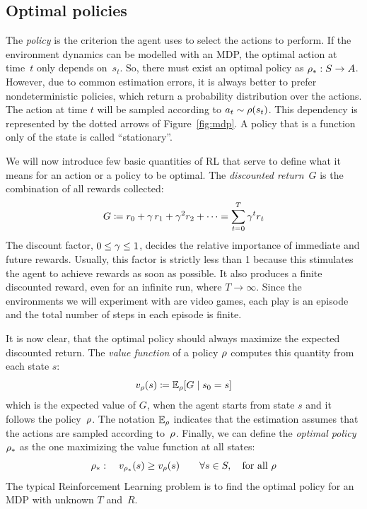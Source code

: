 \subsection{Optimal policies}

The \emph{policy} is the criterion the agent uses to select the actions to
perform. If the environment dynamics can be modelled with an MDP, the
optimal action at time~$t$ only depends on~$s_{t}$. So, there must exist
an optimal policy as ${\rho}_*: S \to A$. However, due to common
estimation errors, it is always better to prefer nondeterministic policies,
which return a probability distribution over the actions. The action at time
$t$ will be sampled according to $a_t \sim \rho(s_t)$. This dependency is
represented by the dotted arrows of Figure~\ref{fig:mdp}. A policy that is a
function only of the state is called ``stationary''.

We will now introduce few basic quantities of RL that serve to define what it
means for an action or a policy to be optimal. The \emph{discounted
return}~$G$ is the combination of all rewards collected:
\begin{equation}
	G \coloneqq r_{0} + \gamma\, r_1 + \gamma^2 r_2 + \dots =
	\sum_{t=0}^{T} \gamma^{t} r_{t}
	\label{eq:return}
\end{equation}
The discount factor, $0 \le \gamma \le 1$, decides the relative importance
of immediate and future rewards. Usually, this factor is strictly less than 1
because this stimulates the agent to achieve rewards as soon as possible.
It also produces a finite discounted reward, even for an infinite run, where
$T \to \infty$.  Since the environments we will experiment with are video
games, each play is an episode and the total number of steps in each episode
is finite.

It is now clear, that the optimal policy should always maximize the expected
discounted return. The \emph{value function} of a policy $\rho$ computes
this quantity from each state $s$:
\begin{equation}
	v_{\rho}(s) \coloneqq \mathbb{E}_{\rho}[G \mid s_0 = s]
\end{equation}
which is the expected value of $G$, when the agent starts from state $s$
and it follows the policy~$\rho$. The notation $\mathbb{E}_{\rho}$ indicates
that the estimation assumes that the actions are sampled according
to~$\rho$. Finally, we can define the \emph{optimal policy}
${\rho}_*$ as the one maximizing the value function at all states:
\begin{equation}
	{\rho}_*: \quad v_{{\rho}_*}(s) \ge v_{\rho}(s) \qquad
	\forall s \in S, \quad \text{for all $\rho$}
\end{equation}
The typical Reinforcement Learning problem is to find the optimal policy for
an MDP with unknown $T$ and~$R$.

